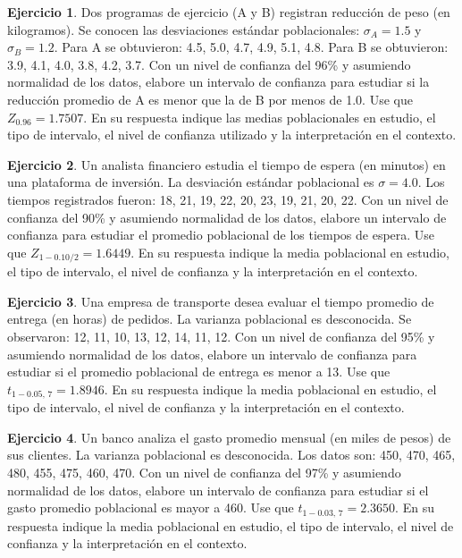 \documentclass[
  11pt,
]{book}
\theoremstyle{definition}
\theoremstyle{definition}
\theoremstyle{definition}
\newtheorem{exercise}{Ejercicio}[chapter]
\theoremstyle{definition}
\theoremstyle{remark}
\begin{document}
\begin{exercise}
Dos programas de ejercicio (A y B) registran reducción de peso (en kilogramos). Se conocen las desviaciones estándar poblacionales: \(\sigma_A = 1.5\) y \(\sigma_B = 1.2\). Para A se obtuvieron: 4.5, 5.0, 4.7, 4.9, 5.1, 4.8. Para B se obtuvieron: 3.9, 4.1, 4.0, 3.8, 4.2, 3.7. Con un nivel de confianza del 96\% y asumiendo normalidad de los datos, elabore un intervalo de confianza para estudiar si la reducción promedio de A es menor que la de B por menos de 1.0. Use que \(Z_{0.96} = 1.7507\). En su respuesta indique las medias poblacionales en estudio, el tipo de intervalo, el nivel de confianza utilizado y la interpretación en el contexto.
\end{exercise}

\begin{exercise}
Un analista financiero estudia el tiempo de espera (en minutos) en una plataforma de inversión. La desviación estándar poblacional es \(\sigma = 4.0\). Los tiempos registrados fueron: 18, 21, 19, 22, 20, 23, 19, 21, 20, 22. Con un nivel de confianza del 90\% y asumiendo normalidad de los datos, elabore un intervalo de confianza para estudiar el promedio poblacional de los tiempos de espera. Use que \(Z_{1-0.10/2} = 1.6449\). En su respuesta indique la media poblacional en estudio, el tipo de intervalo, el nivel de confianza y la interpretación en el contexto.
\end{exercise}

\begin{exercise}
Una empresa de transporte desea evaluar el tiempo promedio de entrega (en horas) de pedidos. La varianza poblacional es desconocida. Se observaron: 12, 11, 10, 13, 12, 14, 11, 12. Con un nivel de confianza del 95\% y asumiendo normalidad de los datos, elabore un intervalo de confianza para estudiar si el promedio poblacional de entrega es menor a 13. Use que \(t_{1-0.05,\,7} = 1.8946\). En su respuesta indique la media poblacional en estudio, el tipo de intervalo, el nivel de confianza y la interpretación en el contexto.
\end{exercise}

\begin{exercise}
Un banco analiza el gasto promedio mensual (en miles de pesos) de sus clientes. La varianza poblacional es desconocida. Los datos son: 450, 470, 465, 480, 455, 475, 460, 470. Con un nivel de confianza del 97\% y asumiendo normalidad de los datos, elabore un intervalo de confianza para estudiar si el gasto promedio poblacional es mayor a 460. Use que \(t_{1-0.03,\,7} = 2.3650\). En su respuesta indique la media poblacional en estudio, el tipo de intervalo, el nivel de confianza y la interpretación en el contexto.
\end{exercise}
\end{document}
